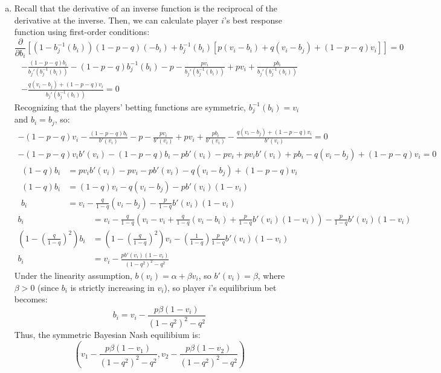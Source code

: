 \documentclass{article}
\newcommand{\binv}[1]{b_j^{-1}\left(#1\right)}
\begin{document}
\begin{enumerate}[(a)]
	
	\item Recall that the derivative of an inverse function is the reciprocal of the derivative at the inverse. Then, we can calculate player $i$'s best response function using first-order conditions:
		$$ \frac{\partial}{\partial b_i}\left[(1-\binv{b_i})(1-p-q)(-b_i) + \binv{b_i}[p(v_i-b_i) + q(v_i-b_j) + (1-p-q)v_i]\right] = 0	$$
		\begin{align*}
			-\frac{(1-p-q)b_i}{b_j'\left(\binv{b_i}\right)} - (1-p-q)\binv{b_i} -p - \frac{pv_i}{b_j'\left(\binv{b_i}\right)} + pv_i + \frac{pb_i}{b_j'\left(\binv{b_i}\right)} 	\\
				- \frac{q(v_i-b_j) + (1-p-q)v_i}{b_j'\left(\binv{b_i}\right)} = 0
		\end{align*}
		Recognizing that the players' betting functions are symmetric, ${\binv{b_i}=v_i}$ and ${b_i=b_j}$, so:
		\begin{align*}
			-(1-p-q)v_i - \frac{(1-p-q)b_i}{b'(v_i)}-p-\frac{pv_i}{b'(v_i)} + pv_i + \frac{pb_i}{b'(v_i)} - \frac{q(v_i-b_j) + (1-p-q)v_i}{b'(v_i)} = 0	\\
			-(1-p-q)v_ib'(v_i) - (1-p-q)b_i - pb'(v_i) - pv_i + pv_ib'(v_i) + pb_i - q(v_i-b_j) + (1-p-q)v_i = 0
		\end{align*}
		\begin{align*}
			(1-q)b_i 	&= pv_ib'(v_i) - pv_i - pb'(v_i) - q(v_i - b_j) + (1-p-q)v_i 	\\
			(1-q)b_i 	&= (1-q)v_i - q(v_i-b_j) - pb'(v_i)(1-v_i)						\\
			b_i			&= v_i - \frac{q}{1-q}(v_i-b_j) - \frac{p}{1-q}b'(v_i)(1-v_i)	
		\end{align*}
		\begin{align*}
			b_i			&= v_i - \frac{q}{1-q}\left(v_i-v_i + \frac{q}{1-q}(v_i-b_i) + \frac{p}{1-q}b'(v_i)(1-v_i)\right) - \frac{p}{1-q}b'(v_i)(1-v_i)	 \\
			\left(1-\left(\frac{q}{1-q}\right)^2\right)b_i &= \left(1-\left(\frac{q}{1-q}\right)^2\right)v_i - \left(\frac{1}{1-q}\right)\frac{p}{1-q}b'(v_i)(1-v_i)	\\
			b_i &= v_i - \frac{pb'(v_i)(1-v_i)}{(1-q^2)^2 - q^2}
		\end{align*}
		Under the linearity assumption, ${b(v_i) = \alpha + \beta v_i}$, so ${b'(v_i) = \beta}$, where ${\beta>0}$ (since $b_i$ is strictly increasing in $v_i$), so player $i$'s equilibrium bet becomes:
		\[
			b_i = v_i - \frac{p\beta(1-v_i)}{(1-q^2)^2 - q^2}
		\]
		Thus, the symmetric Bayesian Nash equilibium is:
		\[
			\left(v_1 - \frac{p\beta(1-v_1)}{(1-q^2)^2 - q^2},v_2 - \frac{p\beta(1-v_2)}{(1-q^2)^2 - q^2}\right)
		\]
	

\end{enumerate}
\end{document}
